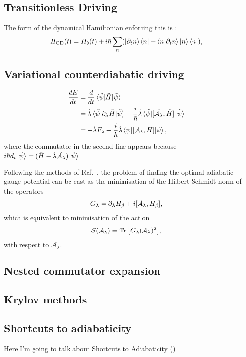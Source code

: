     \subsection{Transitionless Driving}
    The form of the dynamical Hamiltonian enforcing this is \cite{berry_transitionless_2009}:
    \begin{equation}\label{eq:counterdiabatic}
        H_{\mathrm{CD}}(t) = H_0 (t) + i\hbar \sum_n (\ket{\partial_t n}\bra{n} - \bra{n}\ket{\partial_t n}\ket{n}\bra{n}),
    \end{equation}
    \subsection{Variational counterdiabatic driving}

    \begin{equation}\label{eq:energy_derivative}
        \begin{aligned}
            \frac{dE}{dt} &= \frac{d}{dt}\ev*{\Tilde{H}}{\Tilde{\psi}} \\
            &= \dotlambda \ev*{\dlambda \Tilde{H}}{\Tilde{\psi}} - \frac{i}{\hbar} \dotlambda \ev*{\comm*{\Tilde{\AGP{\lambda}}}{\Tilde{H}}}{\Tilde{\psi}} \\
            &= -\dotlambda F_{\lambda} - \frac{i}{\hbar} \dotlambda \ev{\comm{\AGP{\lambda}}{H}}{\psi},
        \end{aligned}
    \end{equation}
    where the commutator in the second line appears because $i\hbar d_t \ket*{\Tilde{\psi}} = (\Tilde{H} - \dot{\lambda}\Tilde{\mathcal{A}_{\lambda}}) \ket*{\Tilde{\psi}}$
    
    Following the methods of Ref.~\cite{sels_minimizing_2017}, the problem of finding the optimal adiabatic gauge potential can be cast as the minimisation of the Hilbert-Schmidt norm of the operators
    \begin{equation}\label{eq:Goperator}
     G_{\lambda}= \dlambda H_\beta + i\comm{\mathcal{A}_\lambda}{H_\beta},
    \end{equation}
    which is equivalent to minimisation of the action
    \begin{equation}\label{eq:actionCD}
    \mathcal{S}(\mathcal{A}_{\lambda}) = \Trace{\left[G_{\lambda}(\mathcal{A}_{\lambda})^2\right]},
    \end{equation}
    with respect to $\mathcal{A}_{\lambda}$.
    \subsection{Nested commutator expansion}
    \subsection{Krylov methods}

    \subsection{Shortcuts to adiabaticity}
    
    Here I'm going to talk about Shortcuts to Adiabaticity 
    ()
